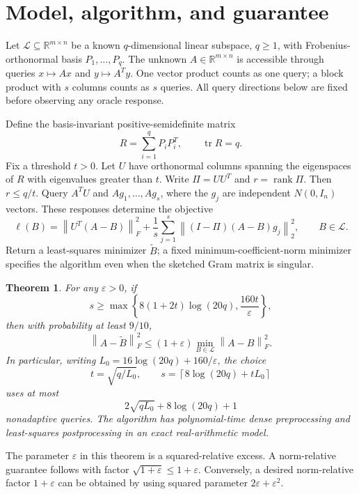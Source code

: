 \documentclass[11pt]{article}
\newtheorem{theorem}{Theorem}[section]
\theoremstyle{definition}
\newcommand{\R}{\mathbb R}
\newcommand{\tr}{\operatorname{tr}}
\newcommand{\rank}{\operatorname{rank}}
\newcommand{\norm}[1]{\left\lVert#1\right\rVert}
\newcommand{\eps}{\varepsilon}
\begin{document}
\section{Model, algorithm, and guarantee}
Let $\mathcal L\subseteq\R^{m\times n}$ be a known $q$-dimensional linear subspace, $q\ge1$, with Frobenius-orthonormal basis $P_1,\ldots,P_q$. The unknown $A\in\R^{m\times n}$ is accessible through queries $x\mapsto Ax$ and $y\mapsto A^Ty$. One vector product counts as one query; a block product with $s$ columns counts as $s$ queries. All query directions below are fixed before observing any oracle response.

Define the basis-invariant positive-semidefinite matrix
\[
 R=\sum_{i=1}^q P_iP_i^T,\qquad \tr R=q.
\]
Fix a threshold $t>0$. Let $U$ have orthonormal columns spanning the eigenspaces of $R$ with eigenvalues greater than $t$. Write $\Pi=UU^T$ and $r=\rank\Pi$. Then $r\le q/t$. Query $A^TU$ and $Ag_1,\ldots,Ag_s$, where the $g_j$ are independent $N(0,I_n)$ vectors. These responses determine the objective
\begin{equation}\label{eq:objective}
 \ell(B)=\norm{U^T(A-B)}_F^2+
       \frac1s\sum_{j=1}^s\norm{(I-\Pi)(A-B)g_j}_2^2,
 \qquad B\in\mathcal L.
\end{equation}
Return a least-squares minimizer $\widetilde B$; a fixed minimum-coefficient-norm minimizer specifies the algorithm even when the sketched Gram matrix is singular.

\begin{theorem}\label{thm:main}
For any $\eps>0$, if
\begin{equation}\label{eq:samples}
 s\ge\max\left\{8(1+2t)\log(20q),\frac{160t}{\eps}\right\},
\end{equation}
then with probability at least $9/10$,
\begin{equation}\label{eq:relative}
 \norm{A-\widetilde B}_F^2
 \le(1+\eps)\min_{B\in\mathcal L}\norm{A-B}_F^2.
\end{equation}
In particular, writing $L_0=16\log(20q)+160/\eps$, the choice
\[
 t=\sqrt{q/L_0},\qquad
 s=\left\lceil8\log(20q)+tL_0\right\rceil
\]
uses at most
\begin{equation}\label{eq:universal}
 2\sqrt{qL_0}+8\log(20q)+1
\end{equation}
nonadaptive queries. The algorithm has polynomial-time dense preprocessing and least-squares postprocessing in an exact real-arithmetic model.
\end{theorem}

The parameter $\eps$ in this theorem is a squared-relative excess. A norm-relative guarantee follows with factor $\sqrt{1+\eps}\le1+\eps$. Conversely, a desired norm-relative factor $1+\varepsilon$ can be obtained by using squared parameter $2\varepsilon+\varepsilon^2$.
\end{document}
